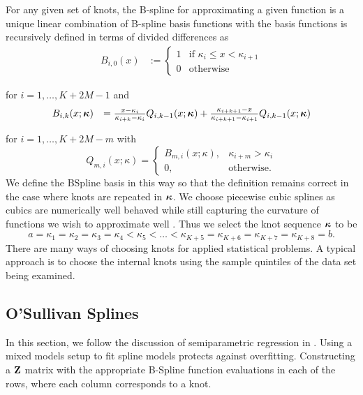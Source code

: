 For any given set of knots, the B-spline for approximating a given function is a unique linear combination of
B-spline basis functions with the basis functions is recursively defined in terms of divided differences as
$$
\begin{array}{rl}
	B_{i, 0}(x) & := \begin{cases}                                                                                                        
	1           & \text{if } \kappa_i \leq x < \kappa_{i+1}                                                                                         \\
	0           & \text{otherwise}                                                                                                        
	\end{cases}
\end{array}
$$

\noindent for $i = 1, \ldots, K + 2M -1$ and
$$
\begin{array}{rl}
	B_{i, k}(x; {\boldsymbol \kappa}) &= \frac{x - \kappa_i}{\kappa_{i + k} - \kappa_i} Q_{i, k-1} (x; {\boldsymbol \kappa}) + 
										\frac{\kappa_{i + k + 1} - x}{\kappa_{i + k + 1} - \kappa_{i + 1}} Q_{i, k-1} (x; {\boldsymbol \kappa})
\end{array}
$$

\noindent for $i = 1, \ldots, K + 2 M - m$ with
$$
Q_{m, i}(x; \kappa) =
\begin{cases}
B_{m, i}(x; \kappa),& \kappa_{i + m} > \kappa_i \\
0, & \text{otherwise}.
\end{cases}
$$
We define the BSpline basis in this way so that the definition remains correct in the case where knots are
repeated in ${\boldsymbol \kappa}$. We choose piecewise cubic splines as cubics are numerically well behaved while still
capturing the curvature of functions we wish to approximate well \citep{Press:2007:NRE:1403886}. Thus we
select the knot sequence ${\boldsymbol \kappa}$ to be
$$
a = \kappa_1 = \kappa_2 = \kappa_3 = \kappa_4 < \kappa_5 < \ldots < \kappa_{K+5} = \kappa_{K+6} = \kappa_{K+7} = \kappa_{K+8} = b.
$$
There are many ways of choosing knots for applied statistical problems. A typical approach is to choose the
internal knots using the sample quintiles of the data set being examined.

\subsection{O'Sullivan Splines}
In this section, we follow the discussion of semiparametric regression in \cite{ruppert_wand_carroll_2003}.
Using a mixed models setup to fit spline models protects against overfitting. Constructing a ${\bf Z}$ matrix with
the appropriate B-Spline function evaluations in each of the rows, where each column corresponds to a knot.

